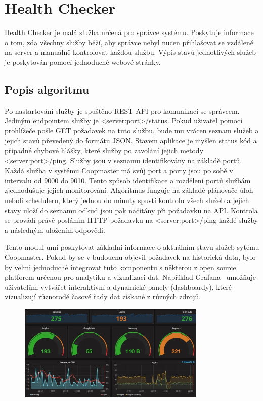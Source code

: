 \section{Health Checker}\label{sec:health-checker}
Health Checker je malá služba určená pro správce systému.
Poskytuje informace o tom, zda všechny služby běží, aby správce nebyl nucen přihlašovat se vzdáleně na server a manuálně kontrolovat každou službu.
Výpis stavů jednotlivých služeb je poskytován pomocí jednoduché webové stránky.

\subsection*{Popis algoritmu}
Po nastartování služby je spuštěno REST API pro komunikaci se správcem.
Jediným endpointem služby je <server:port>/status.
Pokud uživatel pomocí prohlížeče pošle GET požadavek na tuto službu, bude mu vrácen seznam služeb a jejich stavů převedený do formátu JSON.
Stavem aplikace je myšlen status kód a případné chybové hlášky, které služby po zavolání jejich metody <server:port>/ping.
Služby jsou v seznamu identifikovány na základě portů.
Každá služba v systému Coopmaster má svůj port a porty jsou po sobě v intervalu od 9000 do 9010.
Tento způsob identifikace a rozdělení portů službám zjednodušuje jejich monitorování.
Algoritmus funguje na základě plánovače úloh neboli scheduleru, který jednou do minuty spustí kontrolu všech služeb a jejich stavy uloží do seznamu odkud jsou pak načítány při požadavku na API.
Kontrola se provádí právě posláním HTTP požadavku na <server:port>/ping každé služby a následným uložením odpovědi.

Tento modul umí poskytovat základní informace o aktuálním stavu služeb sytému Coopmaster.
Pokud by se v budoucnu objevil požadavek na historická data, bylo by velmi jednoduché integrovat tuto komponentu s některou z open source platforem určenou pro analytiku a vizualizaci dat.
Například Grafana~\cite{grafana} umožňuje uživatelům vytvářet interaktivní a dynamické panely (dashboardy), které vizualizují různorodé časové řady dat získané z různých zdrojů.


\begin{figure}[h]
    \centering
    \includegraphics[width=0.8\textwidth]{img/health-checker-grafana-dashboard}
    \label{fig:health-checker-grafana-dashboard}
\end{figure}


